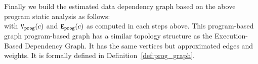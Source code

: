 Finally we build the estimated data dependency graph based on the above program static analysis as follows:
\\
\highlight{
  \[
    \progG(c) = (\progV(c), \progE(c))
    \]
}
with $\mathtt{{V_{prog}}}(c)$ and  $\mathtt{{E_{prog}}}(c)$
as computed in each steps above.
%
This program-based graph program-based graph has a similar topology structure as 
the Execution-Based Dependency Graph. It has the same
vertices 
but approximated edges and weights.  
It is formally defined in Definition~\ref{def:prog_graph}.
